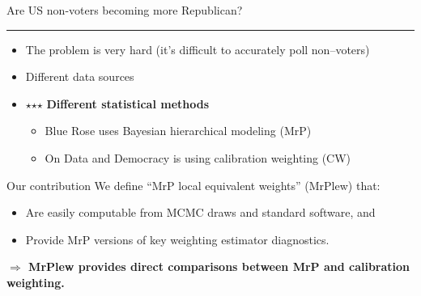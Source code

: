 
\begin{frame}{Are US non-voters becoming more Republican?}

\vspace{1em}
\pause
%
\hrule
\begin{itemize}
\item The problem is very hard (it's difficult to accurately poll non--voters)
\item Different data sources
%
%
\item $\star$$\star$$\star$ \textbf{Different statistical methods}
\begin{itemize}
    \item Blue Rose uses Bayesian hierarchical modeling (MrP)
    \item On Data and Democracy is using calibration weighting (CW)
\end{itemize}
%
\end{itemize}

\pause

\begin{block}{Our contribution}
    We define ``MrP local equivalent weights'' (MrPlew) that:
\begin{itemize}
    \item Are easily computable from MCMC draws and standard software, and
    \item Provide MrP versions of key weighting estimator diagnostics.
\end{itemize}
%
\textbf{$\Rightarrow$ MrPlew provides direct comparisons between
MrP and calibration weighting.}
%
\end{block}

\end{frame}




